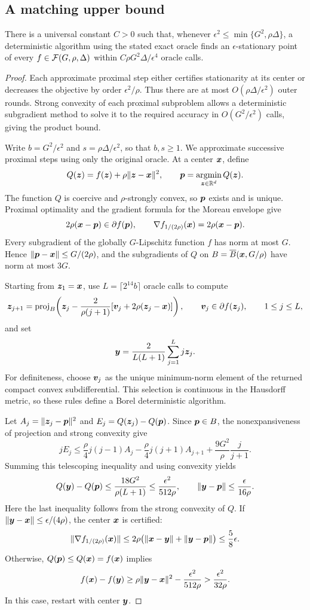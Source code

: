 \begin{appendix}
\section{A matching upper bound}
\label{app:matching-upper}

\begin{proposition}
\label{prop:matching-upper}
There is a universal constant $C>0$ such that, whenever
$\epsilon^2\le\min\{G^2,\rho\Delta\}$, a deterministic algorithm
using the stated exact oracle finds an $\epsilon$-stationary point
of every $f\in{\cal F}(G,\rho,\Delta)$ within
$C\rho G^2\Delta/\epsilon^4$ oracle calls.
\end{proposition}
\begin{proof}
Each approximate proximal step either certifies stationarity at
its center or decreases the objective by order
$\epsilon^2/\rho$. Thus there are at most
$O(\rho\Delta/\epsilon^2)$ outer rounds. Strong convexity of
each proximal subproblem allows a deterministic subgradient method
to solve it to the required accuracy in
$O(G^2/\epsilon^2)$ calls, giving the product bound.

Write $b=G^2/\epsilon^2$ and $s=\rho\Delta/\epsilon^2$, so that
$b,s\ge1$. We approximate successive proximal steps using only
the original oracle. At a center $\bm{x}$, define
\[
 Q(\bm{z})=f(\bm{z})+\rho\|\bm{z}-\bm{x}\|^2,
 \qquad \bm{p}=\operatorname*{argmin}_{\bm{z}\in{\mathbb{R}}^d}Q(\bm{z}).
\]
The function $Q$ is coercive and $\rho$-strongly convex, so $\bm{p}$
exists and is unique. Proximal optimality and the gradient formula
for the Moreau envelope give
\[
 2\rho(\bm{x}-\bm{p})\in\partial f(\bm{p}),
 \qquad
 \nabla f_{1/(2\rho)}(\bm{x})=2\rho(\bm{x}-\bm{p}).
\]
Every subgradient of the globally $G$-Lipschitz function $f$ has
norm at most $G$. Hence $\|\bm{p}-\bm{x}\|\le G/(2\rho)$, and the
subgradients of $Q$ on $B=\overline B(\bm{x},G/\rho)$ have norm
at most $3G$.

Starting from $\bm{z}_1=\bm{x}$, use $L=\lceil2^{14}b\rceil$ oracle calls
to compute
\[
 \bm{z}_{j+1}=\operatorname{proj}_B\!\left(\bm{z}_j-
       \frac{2}{\rho(j+1)}
          [\bm{v}_j+2\rho(\bm{z}_j-\bm{x})]\right),
 \qquad \bm{v}_j\in\partial f(\bm{z}_j),
 \qquad 1\le j\le L,
\]
and set
\[
 \bm{y}=\frac{2}{L(L+1)}\sum_{j=1}^L j\bm{z}_j.
\]
For definiteness, choose $\bm{v}_j$ as the unique minimum-norm element
of the returned compact convex subdifferential. This selection is
continuous in the Hausdorff metric, so these rules define a Borel
deterministic algorithm.

Let $A_j=\|\bm{z}_j-\bm{p}\|^2$ and $E_j=Q(\bm{z}_j)-Q(\bm{p})$.
Since $\bm{p}\in B$, the nonexpansiveness of projection and strong
convexity give
\[
 jE_j\le
 \frac\rho4j(j-1)A_j
 -\frac\rho4j(j+1)A_{j+1}
 +\frac{9G^2}{\rho}\frac{j}{j+1}.
\]
Summing this telescoping inequality and using convexity yields
\[
 Q(\bm{y})-Q(\bm{p})
 \le\frac{18G^2}{\rho(L+1)}
 \le\frac{\epsilon^2}{512\rho},
 \qquad
 \|\bm{y}-\bm{p}\|\le\frac{\epsilon}{16\rho}.
\]
Here the last inequality follows from the strong convexity of $Q$.
If $\|\bm{y}-\bm{x}\|\le\epsilon/(4\rho)$, the center $\bm{x}$ is certified:
\[
 \|\nabla f_{1/(2\rho)}(\bm{x})\|
 \le 2\rho\bigl(\|\bm{x}-\bm{y}\|+\|\bm{y}-\bm{p}\|\bigr)
 \le\frac58\epsilon.
\]
Otherwise, $Q(\bm{p})\le Q(\bm{x})=f(\bm{x})$ implies
\[
 f(\bm{x})-f(\bm{y})
 \ge\rho\|\bm{y}-\bm{x}\|^2-\frac{\epsilon^2}{512\rho}
 >\frac{\epsilon^2}{32\rho}.
\]
In this case, restart with center $\bm{y}$.


\end{proof}
\end{appendix}

